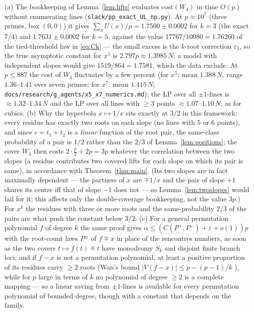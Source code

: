 \begin{remark}
(a) The bookkeeping of Lemma~\ref{lem:lifts} evaluates $\mathrm{cost}(W_4)$ in time $O(p)$ without enumerating lines
(\texttt{slack/pp\_exact\_UL\_np.py}).  At $p\approx10^7$ (three primes, box $(0,0)$) it gives $\sum_xU(x)/p=1.7500\pm0.0002$ for $k=3$ (the exact $7/4$) and
$1.7631\pm0.0002$ for $k=5$, against the value $17767/10080=1.76260$ of the tied-threshold law in \eqref{eq:Ck} — the small excess is the $k$-root
correction $\varepsilon_5$, so the true asymptotic constant for $x^5$ is $2.797p\approx1.3985\,N$; a model with independent slopes would give
$1519/864=1.7581$, which the data exclude.  At $p\le887$ the cost of $W_4$ fluctuates by a few percent (for $x^5$: mean $1.388\,N$, range $1.36$--$1.41$
over seven primes; for $x^7$: mean $1.415\,N$; \texttt{docs/research/g\_agents/x5\_x7\_numerics.md}); the LP over all $\pm1$-lines is $\approx1.32$--$1.34\,N$
and the LP over all lines with $\ge3$ points $\approx1.07$--$1.10\,N$, as for cubics.
(b) Why the hyperbola $x\mapsto1/x$ sits exactly at $3/2$ in this framework: every residue has exactly two roots on each slope (no lines with $5$ or $6$
points), and since $c=t_1+t_2$ is a \emph{linear} function of the root pair, the same-class probability of a pair is $1/2$ rather than the $2/3$ of
Lemma~\ref{lem:positions}; the cover $W_4$ then costs $2\cdot\frac p2+2p=3p$ whatever the correlation between the two slopes (a residue contributes two
covered lifts for each slope on which its pair is same), in accordance with Theorem~\ref{thm:main}.  (Its two slopes are in fact maximally dependent —
the partners of $x$ are $\mp1/x$ and the pair of slope $+1$ shares its centre iff that of slope $-1$ does not — so Lemma~\ref{lem:twoslopes} would fail
for it; this affects only the double-coverage bookkeeping, not the value $3p$.)  For $x^k$ the residues with three or more roots and the same-probability
$2/3$ of the pairs are what push the constant below $3/2$.
(c) For a general permutation polynomial $f$ of degree $k$ the same proof gives $\alpha\le(C(P^+,P^-)+\varepsilon+o(1))p$ with the root-count laws
$P^\pm$ of $f\mp x$ in place of the rencontres numbers, as soon as the two covers $t\mapsto f(t)\mp t$ have monodromy $S_k$ and disjoint finite branch
loci; and if $f-x$ is not a permutation polynomial, at least a positive proportion of its residues carry $\ge2$ roots (Wan's bound $|V(f-x)|\le p-(p-1)/k$
\cite{Wan93}), while for $p$ large in terms of $k$ no polynomial of degree $\ge2$ is a complete mapping \cite{NR82} — so a linear saving from
$\pm1$-lines is available for every permutation polynomial of bounded degree, though with a constant that depends on the family.
\end{remark}
